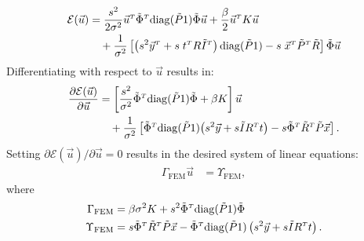 \documentclass[journal]{IEEEtran}
\newcommand{\di}[2]{\frac{\partial#1}{\partial#2}}
\newcommand{\trans}[1]{#1^{\scriptscriptstyle T}}
\newcommand{\diag}{\mathrm{diag}}
\begin{document}
\begin{align}\label{eq:FE4}
    \mathcal{E}(\vec{u}) & = \dfrac{s^2}{2\sigma^2}\trans{\vec{u}}\trans{\tilde{\Phi}}\diag(\tilde{P}1)\tilde{\Phi}\vec{u} + \dfrac{\beta}{2}\trans{\vec{u}}K\vec{u}\\
    & \quad + \dfrac{1}{\sigma^2}\left[\left(s^2\trans{\vec{y}}+s\;\trans{t}R\trans{\tilde{I}}\right)
        \diag(\tilde{P}1)-s\;\trans{\vec{x}}\trans{\tilde{P}}\tilde{R}\right]\tilde{\Phi}\vec{u}\notag
\end{align}
Differentiating with respect to $\vec{u}$ results in:
\begin{align}\label{eq:FE5}
    \di{\mathcal{E}(\vec{u})}{\vec{u}} & = \left[\dfrac{s^2}{\sigma^2}\trans{\tilde{\Phi}}\diag(\tilde{P}1)\tilde{\Phi} + \beta K\right]\vec{u}\\
        & \quad + \dfrac{1}{\sigma^2}\left[\trans{\tilde{\Phi}}\diag(\tilde{P}1)\!\left(s^2\vec{y}+s\tilde{I}\trans{R}t\right)
        -s\trans{\tilde{\Phi}}\trans{\tilde{R}}\tilde{P}\vec{x}\right].\notag
\end{align}
Setting $\partial\mathcal{E}(\vec{u})/\partial\vec{u}\!=\!0$ results in the desired system of linear equations:
\begin{align*}
    \Gamma_\mathrm{FEM}\vec{u} &= \Upsilon_\mathrm{FEM},
\end{align*}
where
\begin{align*}
\Gamma_\mathrm{FEM} &= \beta \sigma^2K + s^2\trans{\tilde{\Phi}}\diag(\tilde{P}1)\tilde{\Phi}\\
    \Upsilon_\mathrm{FEM} &= s\trans{\tilde{\Phi}}\trans{\tilde{R}}\tilde{P}\vec{x} - \trans{\tilde{\Phi}}\diag(\tilde{P}1)\left(s^2\vec{y}+s\tilde{I}\trans{R}t\right).\notag
\end{align*}

\ifCLASSOPTIONcaptionsoff
  \newpage
\fi



\end{document}
